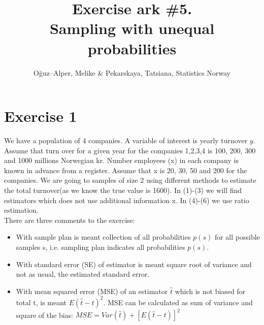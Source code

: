 \documentclass[12pt]{article}
\begin{document}
\title{Exercise ark \#5.\\ Sampling with unequal probabilities}
\author{O\u{g}uz--Alper, Melike \& Pekarskaya, Tatsiana, Statistics Norway}
\maketitle

\section*{Exercise 1}
We have a population of 4 companies. A variable of interest is yearly turnover $y$. Assume that turn over for a given year for the companies 1,2,3,4 is 100, 200, 300 and 1000 millions Norwegian kr. Number employees (x) in each company is known in advance from a register. Assume that x is 20, 30, 50 and 200 for the companies. We are going to samples of size 2 using different methods to estimate the total turnover(as we know the true value is 1600). In (1)-(3) we will find estimators which does not use additional information x. In (4)-(6) we use ratio estimation.\\
There are three comments to the exercise:
\begin{itemize}
\item With sample plan is meant collection of all probabilities $p(s)$ for all possible samples s, i.e. sampling plan indicates all probabilities $p(s)$.
\item With standard error (SE) of estimator is meant square root of variance and not as usual, the estimated standard error.
\item With mean squared error (MSE) of an estimator $\hat{t}$ which is not biased for total t, is meant $E(\hat{t} - t)^2$. MSE can be calculated as sum of variance and square of the bias: $MSE = Var(\hat{t})+[E(\hat{t} - t)]^2$
\end{itemize}
\end{document}
